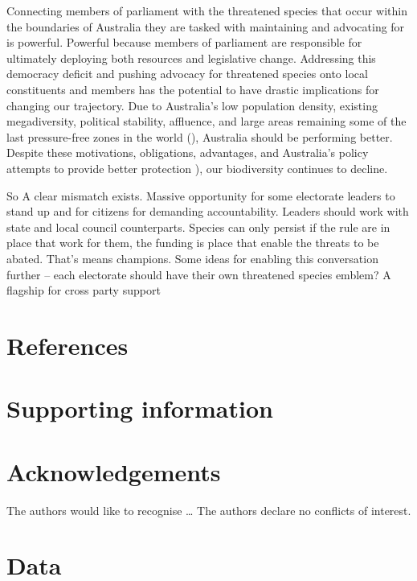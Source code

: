 \documentclass[a4paper,11pt]{article}
\begin{document}
Connecting members of parliament with the threatened species that occur within the boundaries of Australia they are tasked with maintaining and advocating for is powerful. Powerful because members of parliament are responsible for ultimately deploying both resources and legislative change.
Addressing this democracy deficit and pushing advocacy for threatened species onto local constituents and members has the potential to have drastic implications for changing our trajectory.
Due to Australia's low population density, existing megadiversity, political stability, affluence, and large areas remaining some of the last pressure-free zones in the world (\cite{venterSixteenYearsChange2016}), Australia should be performing better. Despite these motivations, obligations, advantages, and Australia's policy attempts to provide better protection \cite{wardLotsLossLittle2019}), our biodiversity continues to decline.

So A clear mismatch exists. 
Massive opportunity for some electorate leaders to stand up and for citizens for demanding accountability. 
Leaders should work with state and local council counterparts. 
Species can only persist if the rule are in place that work for them, the funding is place that enable the threats to be abated. That’s means champions. 
Some ideas for enabling this conversation further – each electorate should have their own threatened species emblem? A flagship for cross party support

\newpage
\nolinenumbers
\section{References}
\printbibliography

\newpage
\section{Supporting information}

\newpage
\section{Acknowledgements}
The authors would like to recognise \ldots
The authors declare no conflicts of interest.

\newpage
\section{Data}
\end{document}
